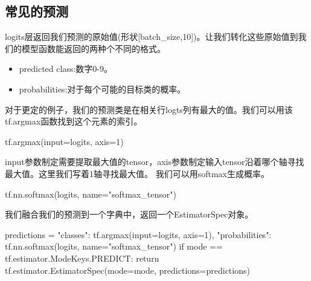\subsection{常见的预测}
logits层返回我们预测的原始值(形状[batch\_size,10])。让我们转化这些原始值到我们的模型函数能返回的两种个不同的格式。
\begin{itemize}
\item predicted class:数字0-9。
\item probabilities:对于每个可能的目标类的概率。
\end{itemize}
对于更定的例子，我们的预测类是在相关行logts列有最大的值。我们可以用该tf.argmax函数找到这个元素的索引。
\begin{python}
tf.argmax(input=logits, axis=1)
\end{python}
input参数制定需要提取最大值的tensor，axis参数制定输入tensor沿着哪个轴寻找最大值。这里我们写着1轴寻找最大值。
我们可以用softmax生成概率。
\begin{python}
tf.nn.softmax(logits, name="softmax_tensor")
\end{python}
我们融合我们的预测到一个字典中，返回一个EstimatorSpec对象。
\begin{python}
predictions = {
    "classes": tf.argmax(input=logits, axis=1),
    "probabilities": tf.nn.softmax(logits, name="softmax_tensor")
}
if mode == tf.estimator.ModeKeys.PREDICT:
  return tf.estimator.EstimatorSpec(mode=mode, predictions=predictions)
\end{python}
